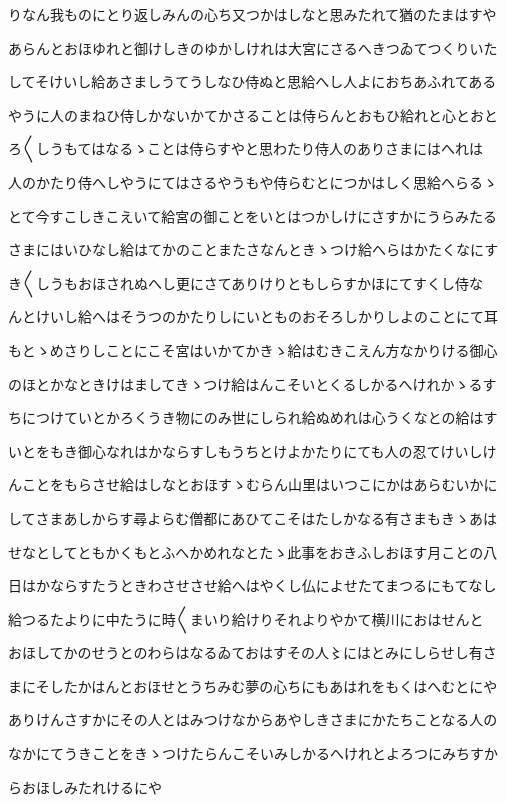 \documentclass[a4paper,11pt,landscape]{ltjtarticle}
\begin{document}
\par\medskip
りなん我ものにとり返しみんの心ち又つかはしなと思みたれて猶のたまはすや
\par\medskip
あらんとおほゆれと御けしきのゆかしけれは大宮にさるへきつゐてつくりいた
\par\medskip
してそけいし給あさましうてうしなひ侍ぬと思給へし人よにおちあふれてある
\par\medskip
やうに人のまねひ侍しかないかてかさることは侍らんとおもひ給れと心とおと
\par\medskip
ろ〱しうもてはなるゝことは侍らすやと思わたり侍人のありさまにはへれは
\par\medskip
人のかたり侍へしやうにてはさるやうもや侍らむとにつかはしく思給へらるゝ
\par\medskip
とて今すこしきこえいて給宮の御ことをいとはつかしけにさすかにうらみたる
\par\medskip
さまにはいひなし給はてかのことまたさなんときゝつけ給へらはかたくなにす
\par\medskip
き〱しうもおほされぬへし更にさてありけりともしらすかほにてすくし侍な
\par\medskip
んとけいし給へはそうつのかたりしにいとものおそろしかりしよのことにて耳
\par\medskip
もとゝめさりしことにこそ宮はいかてかきゝ給はむきこえん方なかりける御心
\par\medskip
のほとかなときけはましてきゝつけ給はんこそいとくるしかるへけれかゝるす
\par\medskip
ちにつけていとかろくうき物にのみ世にしられ給ぬめれは心うくなとの給はす
\par\medskip
いとをもき御心なれはかならすしもうちとけよかたりにても人の忍てけいしけ
\par\medskip
んことをもらさせ給はしなとおほすゝむらん山里はいつこにかはあらむいかに
\par\medskip
してさまあしからす尋よらむ僧都にあひてこそはたしかなる有さまもきゝあは
\par\medskip
せなとしてともかくもとふへかめれなとたゝ此事をおきふしおほす月ことの八
\par\medskip
日はかならすたうときわさせさせ給へはやくし仏によせたてまつるにもてなし
\par\medskip
給つるたよりに中たうに時〱まいり給けりそれよりやかて横川におはせんと
\par\medskip
おほしてかのせうとのわらはなるゐておはすその人〻にはとみにしらせし有さ
\par\medskip
まにそしたかはんとおほせとうちみむ夢の心ちにもあはれをもくはへむとにや
\par\medskip
ありけんさすかにその人とはみつけなからあやしきさまにかたちことなる人の
\par\medskip
なかにてうきことをきゝつけたらんこそいみしかるへけれとよろつにみちすか
\par\medskip
らおほしみたれけるにや
\par\medskip
\end{document}
